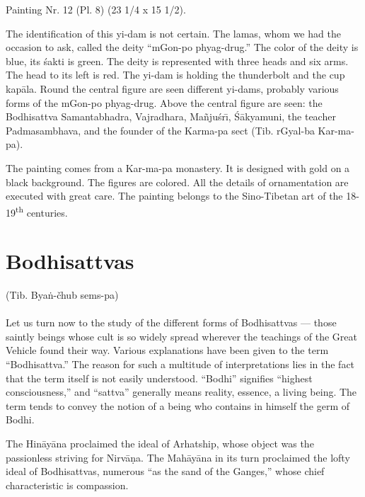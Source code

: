 \documentclass[a4paper, 12pt, oneside]{article}
\begin{document}
\bigskip

Painting Nr. 12 (Pl. 8) (23 1/4 x 15 1/2).

\bigskip

The identification of this yi-dam is not certain. The lamas, whom we had the occasion to ask, called the deity ``mGon-po phyag-drug.'' The color of the deity is blue, its \'{s}akti is green. The deity is represented with three heads and six arms. The head to its left is red. The yi-dam is holding the thunderbolt and the cup kap\={a}la. Round the central figure are seen different yi-dams, probably various forms of the mGon-po phyag-drug. Above the central figure are seen: the Bodhisattva Samantabhadra, Vajradhara, Ma\~{n}ju\'{s}r\={\i}, \'{S}\={a}kyamuni, the teacher Padmasambhava, and the founder of the Karma-pa sect (Tib. rGyal-ba Kar-ma-pa).

The painting comes from a Kar-ma-pa monastery. It is designed with gold on a black background. The figures are colored. All the details of ornamentation are executed with great care. The painting belongs to the Sino-Tibetan art of the 18-19\textsuperscript{th} centuries.

\clearpage
\section{Bodhisattvas}
\begin{center}
(Tib. Bya\.{n}-čhub sems-pa) 
\end{center}
\paragraph{}
Let us turn now to the study of the different forms of Bodhisattvas --- those saintly beings whose cult is so widely spread wherever the teachings of the Great Vehicle found their way. Various explanations have been given to the term ``Bodhisattva.'' The reason for such a multitude of interpretations lies in the fact that the term itself is not easily understood. ``Bodhi'' signifies ``highest consciousness,'' and ``sattva'' generally means reality, essence, a living being. The term tends to convey the notion of a being who contains in himself the germ of Bodhi.

The Hin\={a}y\={a}na proclaimed the ideal of Arhatship, whose object was the passionless striving for Nirv\={a}\d{n}a. The Mah\={a}y\={a}na in its turn proclaimed the lofty ideal of Bodhisattvas, numerous ``as the sand of the Ganges,'' whose chief characteristic is compassion.
\end{document}
